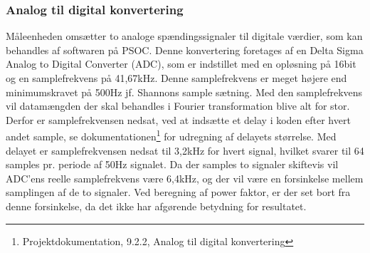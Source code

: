 
\subsubsection{Analog til digital konvertering}
Måleenheden omsætter to analoge spændingssignaler til digitale værdier, som kan behandles af softwaren på PSOC. Denne konvertering foretages af en Delta Sigma Analog to Digital Converter (ADC), som er indstillet med en opløsning på 16bit og en samplefrekvens på 41,67kHz. Denne samplefrekvens er meget højere end minimumskravet på 500Hz jf. Shannons sample sætning. Med den samplefrekvens vil datamængden der skal behandles i Fourier transformation blive alt for stor. Derfor er samplefrekvensen nedsat, ved at indsætte et delay i koden efter hvert andet sample, se dokumentationen\footnote{Projektdokumentation, 9.2.2, Analog til digital konvertering} for udregning af delayets størrelse. Med delayet er samplefrekvensen nedsat til 3,2kHz for hvert signal, hvilket svarer til 64 samples pr. periode af 50Hz signalet. Da der samples to signaler skiftevis vil ADC'ens reelle samplefrekvens være 6,4kHz, og der vil være en forsinkelse mellem samplingen af de to signaler. Ved beregning af power faktor, er der set bort fra denne forsinkelse, da det ikke har afgørende betydning for resultatet.  
